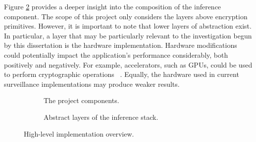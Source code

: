 \indent \indent
Figure \ref{fig:abstractInference} provides a deeper insight into the composition of the inference component. The scope of this project only considers the layers above encryption primitives. However, it is important to note that lower layers of abstraction exist. In particular, a layer that may be particularly relevant to the investigation begun by this dissertation is the hardware implementation. Hardware modifications could potentially impact the application's performance considerably, both positively and negatively. For example, accelerators, such as GPUs, could be used to perform cryptographic operations ~\cite{Badawi}. Equally, the hardware used in current surveillance implementations may produce weaker results.
\begin{figure}[ht]
    \begin{subfigure}[b]{0.5\textwidth}
        \centering
        \scalebox{0.5}{}
        \caption{The project components.}
        \label{fig:abstractNetwork}
    \end{subfigure}%
    \begin{subfigure}[b]{0.5\textwidth}
        \centering
        \scalebox{0.7}{}
        \caption{Abstract layers of the inference stack.}
        \label{fig:abstractInference}
    \end{subfigure}%
    \caption{High-level implementation overview.}
    \label{fig:abstraction}
\end{figure}

\setlength{\leftskip}{0cm}
